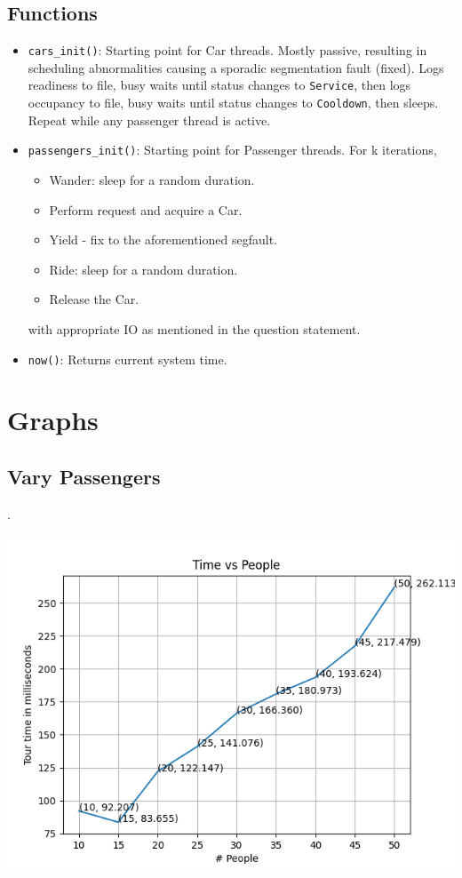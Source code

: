 \documentclass{amsart}
\begin{document}
\subsection{Functions}
\begin{itemize}
    \item \texttt{cars\_init()}: Starting point for Car threads. Mostly passive, resulting in scheduling abnormalities causing a sporadic segmentation fault (fixed). Logs readiness to file, busy waits until status changes to \texttt{Service}, then logs occupancy to file, busy waits until status changes to \texttt{Cooldown}, then sleeps. Repeat while any passenger thread is active.
    \item \texttt{passengers\_init()}: Starting point for Passenger threads. For k iterations, \begin{itemize}
        \item Wander: sleep for a random duration.
        \item Perform request and acquire a Car.
        \item Yield - fix to the aforementioned segfault.
        \item Ride: sleep for a random duration.
        \item Release the Car.
    \end{itemize}
    with appropriate IO as mentioned in the question statement.
    \item \texttt{now()}: Returns current system time.
\end{itemize}

\section{Graphs}
\subsection{Vary Passengers}.

\includegraphics[scale = 0.9]{../people.png}
\end{document}
